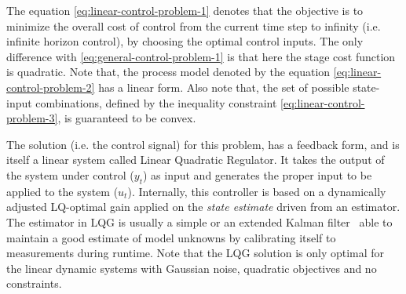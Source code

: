 The equation \ref{eq:linear-control-problem-1}  denotes that the objective is to minimize the overall cost of control from the current time step to infinity (i.e. infinite horizon control), by choosing the optimal control inputs.  The only difference with \ref{eq:general-control-problem-1} is that here the stage cost function is quadratic.
Note that, the process model denoted by the equation \ref{eq:linear-control-problem-2}   has a linear form. Also note that, the set of possible state-input combinations,  defined by  the inequality constraint \ref{eq:linear-control-problem-3},  is guaranteed to be convex. 
  
 The solution (i.e. the control signal) for this problem, has a feedback form, and is itself a linear system called Linear Quadratic Regulator\cite{lqr}. It takes the output of the system under control ($y_t$) as input and generates the proper input to be applied to the system ($u_t$). 
 Internally, this controller is based on a dynamically adjusted LQ-optimal gain applied on the \textit{state estimate} driven from an estimator. 
 The estimator in LQG is usually a simple or an extended Kalman filter~\cite{welch_introduction_1995}  able to maintain a good estimate of model unknowns by calibrating itself to measurements during runtime.
 Note that the LQG solution is only optimal for the linear dynamic systems with Gaussian noise, quadratic objectives and no constraints. 
   

